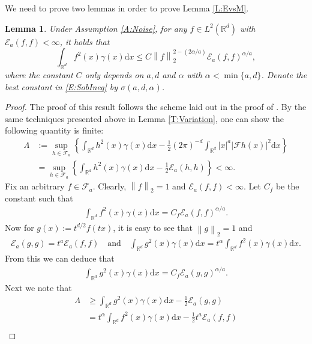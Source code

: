 \documentclass[a4paper,11pt]{article}
\numberwithin{equation}{section}
\numberwithin{equation}{section}
\theoremstyle{plain}
\newtheorem{lemma}[theorem]{Lemma}
\theoremstyle{definition}
\newcommand{\ud}{\ensuremath{\mathrm{d} }}
\newcommand{\Norm}[1]{\left\|  #1   \right\|}
\newcommand{\R}{\mathbb{R}}
\begin{document}
We need to prove two lemmas in order to prove Lemma \ref{L:EvsM}.

\begin{lemma} \label{L:gammaf2bdd}
  Under Assumption \ref{A:Noise}, for any $f \in L^2(\R^d)$ with $\mathcal{E}_a(f,f) < \infty$, it
  holds that
  \begin{equation} \label{E:SobIneq}
    \int_{\R^d} f^2(x)\gamma(x) \ud x \le C \Norm{f}_2^{2-(2\alpha/a)} \mathcal{E}_a(f,f)^{\alpha/a},
  \end{equation}
  where the constant $C$ only depends on $a, d$ and $\alpha$ with $\alpha < \min\{a,d\}$. Denote the
  best constant in \eqref{E:SobIneq} by $\sigma(a,d,\alpha)$.
\end{lemma}
\begin{proof}
  The proof of this result follows the scheme laid out in the proof of \cite[Lemma A.3]{ChenAOP12}.
  By the same techniques presented above in Lemma \ref{T:Variation}, one can show the following
  quantity is finite:
  \begin{align*}
    \Lambda & := \sup_{h\in\mathcal{F}_a}  \left\{  \int_{\R^d} h^2(x)\gamma(x) \ud x - \frac{1}{2} (2\pi)^{-d}\int_{\R^d} |x|^a|\mathcal{F} h(x)|^2 \ud x  \right\} \\
            & =    \sup_{h\in\mathcal{F}_a}  \left\{  \int_{\R^d} h^2(x)\gamma(x) \ud x - \frac{1}{2} \mathcal{E}_a(h,h)\right\} < \infty.
  \end{align*}
  Fix an arbitrary $f \in \mathcal{F}_a$. Clearly, $\Norm{f}_2 = 1$ and $\mathcal{E}_a(f,f) <
  \infty$. Let $C_f$ be the constant such that
  \begin{align*}
    \int_{\R^d} f^2(x)\gamma(x)\ud x = C_f  \mathcal{E}_a(f,f)^{\alpha / a}.
  \end{align*}
  Now for $g(x):= t^{d/2} f(tx)$, it is easy to see that $\Norm{g}_2 = 1$ and
  \begin{align*}
    \mathcal{E}_a(g,g)                = t^a\mathcal{E}_a(f,f) \quad \text{and} \quad
    \int_{\R^d} g^2(x)\gamma(x) \ud x = t^\alpha \int_{\R^d} f^2(x)\gamma(x)\ud x.
  \end{align*}
  From this we can deduce that
  \begin{align*}
    \int_{\R^d} g^2(x)\gamma(x)\ud x = C_f \mathcal{E}_a(g,g)^{\alpha/a}.
  \end{align*}
  Next we note that
  \begin{align*}
    \Lambda & \ge \int_{\R^d} g^2(x)\gamma(x)\ud x - \frac{1}{2}\mathcal{E}_a(g,g)               \\
            & = t^\alpha \int_{\R^d} f^2(x)\gamma(x) \ud x - \frac{1}{2}t^a \mathcal{E}_a(f,f)   \\

\end{align*}
\end{proof}
\end{document}
